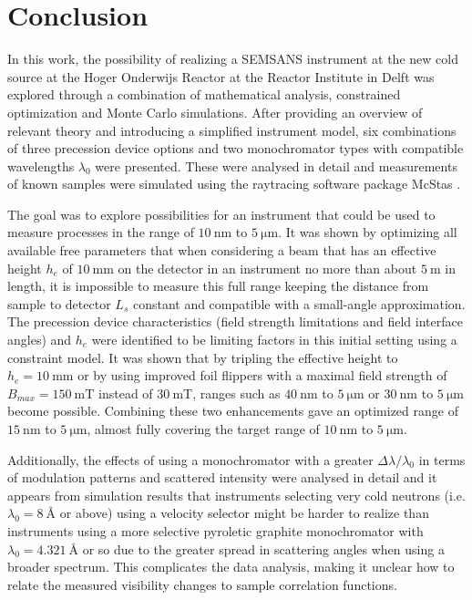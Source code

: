 \chapter{Conclusion}
\label{chapter:conclusion}
\label{c7:conclusion}
In this work, the possibility of realizing a SEMSANS instrument at the new cold source at the Hoger Onderwijs Reactor at the Reactor Institute in Delft was explored through a combination of mathematical analysis, constrained optimization and Monte Carlo simulations. After providing an overview of relevant theory and introducing a simplified instrument model, six combinations of three precession device options and two monochromator types with compatible wavelengths $\lambda_0$ were presented. These were analysed in detail and measurements of known samples were simulated using the raytracing software package McStas \cite{willendrup2020}. 

The goal was to explore possibilities for an instrument that could be used to measure processes in the range of $\SI{10}{\nano\meter}$ to $\SI{5}{\micro\meter}$. It was shown by optimizing all available free parameters that when considering a beam that has an effective height $h_e$ of $\SI{10}{\milli\meter}$ on the detector in an instrument no more than about $\SI{5}{\meter}$ in length, it is impossible to measure this full range keeping the distance from sample to detector $L_s$ constant and compatible with a small-angle approximation. The precession device characteristics (field strength limitations and field interface angles) and  $h_e$ were identified to be limiting factors in this initial setting using a constraint model. It was shown that by tripling the effective height to $h_e = \SI{10}{\milli\meter}$ or by using improved foil flippers with a maximal field strength of $B_{max} = \SI{150}{\milli\tesla}$ instead of $\SI{30}{\milli\tesla}$, ranges such as $\SI{40}{\nano\meter}$ to $\SI{5}{\micro\meter}$ or $\SI{30}{\nano\meter}$ to $\SI{5}{\micro\meter}$ become possible. Combining these two enhancements gave an optimized range of $\SI{15}{\nano\meter}$ to $\SI{5}{\micro\meter}$, almost fully covering the target range of $\SI{10}{\nano\meter}$ to $\SI{5}{\micro\meter}$.

Additionally, the effects of using a monochromator with a greater $\Delta\lambda/\lambda_0$ in terms of modulation patterns and scattered intensity were analysed in detail and it appears from simulation results that instruments selecting very cold neutrons (i.e. $\lambda_0 = \SI{8}{\angstrom}$ or above) using a velocity selector might be harder to realize than instruments using a more selective pyroletic graphite monochromator with $\lambda_0 = \SI{4.321}{\angstrom}$ or so due to the greater spread in scattering angles when using a broader spectrum. This complicates the data analysis, making it unclear how to relate the measured visibility changes to sample correlation functions.

